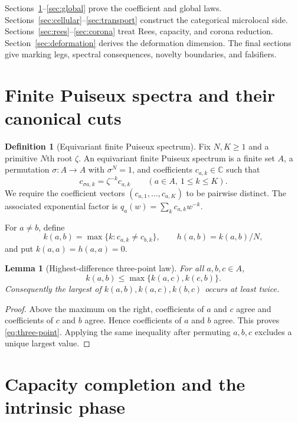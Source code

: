 \documentclass[11pt,a4paper]{amsart}
\theoremstyle{plain}
\newtheorem{lemma}[theorem]{Lemma}
\theoremstyle{definition}
\newtheorem{definition}[theorem]{Definition}
\newcommand{\CC}{\mathbb C}
\begin{document}
Sections~\ref{sec:coefficients}--\ref{sec:global} prove the coefficient and global laws.
Sections~\ref{sec:cellular}--\ref{sec:transport} construct the categorical microlocal side.
Sections~\ref{sec:rees}--\ref{sec:corona} treat Rees, capacity, and corona reduction.
Section~\ref{sec:deformation} derives the deformation dimension.  The final sections give marking
legs, spectral consequences, novelty boundaries, and falsifiers.

\section{Finite Puiseux spectra and their canonical cuts}\label{sec:coefficients}

\begin{definition}[Equivariant finite Puiseux spectrum]\label{def:spectrum}
Fix $N,K\geq1$ and a primitive $N$th root $\zeta$.  An equivariant finite Puiseux spectrum is a
finite set $A$, a permutation $\sigma:A\to A$ with $\sigma^N=1$, and coefficients
$c_{a,k}\in\CC$ such that
\[
                  c_{\sigma a,k}=\zeta^{-k}c_{a,k}
                  \qquad(a\in A,\ 1\leq k\leq K).
\]
We require the coefficient vectors $(c_{a,1},\ldots,c_{a,K})$ to be pairwise distinct.  The
associated exponential factor is $q_a(w)=\sum_kc_{a,k}w^{-k}$.
\end{definition}

For $a\ne b$, define
\[
 k(a,b)=\max\{k:c_{a,k}\ne c_{b,k}\},\qquad h(a,b)=k(a,b)/N,
\]
and put $k(a,a)=h(a,a)=0$.

\begin{lemma}[Highest-difference three-point law]\label{lem:three-point}
For all $a,b,c\in A$,
\begin{equation}\label{eq:three-point}
                         k(a,b)\leq\max\{k(a,c),k(c,b)\}.
\end{equation}
Consequently the largest of $k(a,b),k(a,c),k(b,c)$ occurs at least twice.
\end{lemma}

\begin{proof}
Above the maximum on the right, coefficients of $a$ and $c$ agree and coefficients of $c$ and $b$
agree.  Hence coefficients of $a$ and $b$ agree.  This proves \eqref{eq:three-point}.  Applying the
same inequality after permuting $a,b,c$ excludes a unique largest value.
\end{proof}

\section{Capacity completion and the intrinsic phase}\label{sec:capacity}
\end{document}
